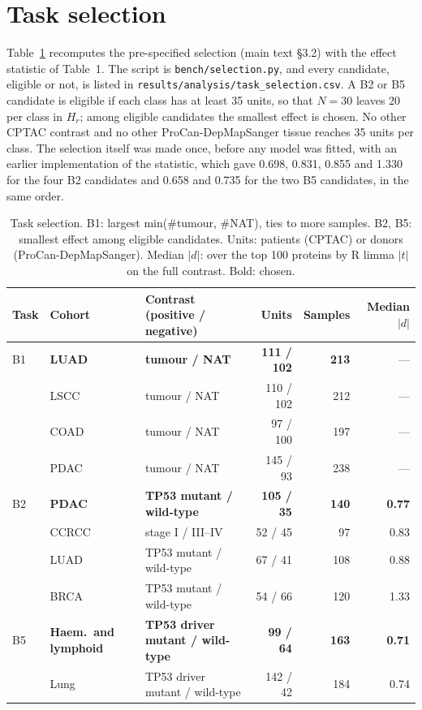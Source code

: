 \documentclass[10pt,letterpaper]{article}
\begin{document}
\section{Task selection}\label{sup:selection}
Table~\ref{tab:selection} recomputes the pre-specified selection (main text \S3.2) with the effect statistic
of Table~1. The script is \texttt{bench/selection.py}, and every candidate, eligible or not, is listed in
\texttt{results/analysis/task\_selection.csv}. A B2 or B5 candidate is eligible if each class has at least 35
units, so that $N = 30$ leaves 20 per class in $H_r$; among eligible candidates the smallest effect is chosen.
No other CPTAC contrast and no other ProCan-DepMapSanger tissue reaches 35 units per class. The selection itself
was made once, before any model was fitted, with an earlier implementation of the statistic, which gave 0.698,
0.831, 0.855 and 1.330 for the four B2 candidates and 0.658 and 0.735 for the two B5 candidates, in the same
order.

\begin{table}[H]
\centering
\caption{Task selection. B1: largest min(\#tumour, \#NAT), ties to more samples. B2, B5: smallest effect among
eligible candidates. Units: patients (CPTAC) or donors (ProCan-DepMapSanger). Median $|d|$: over the top 100
proteins by R limma $|t|$ on the full contrast. Bold: chosen.}
\label{tab:selection}
\begin{tabular}{@{}l l l r r r@{}}
\toprule
Task & Cohort & Contrast (positive / negative) & Units & Samples & Median $|d|$ \\
\midrule
B1 & \textbf{LUAD} & \textbf{tumour / NAT} & \textbf{111 / 102} & \textbf{213} & --- \\
 & LSCC & tumour / NAT & 110 / 102 & 212 & --- \\
 & COAD & tumour / NAT & 97 / 100 & 197 & --- \\
 & PDAC & tumour / NAT & 145 / 93 & 238 & --- \\
\midrule
B2 & \textbf{PDAC} & \textbf{TP53 mutant / wild-type} & \textbf{105 / 35} & \textbf{140} & \textbf{0.77} \\
 & CCRCC & stage I / III--IV & 52 / 45 & 97 & 0.83 \\
 & LUAD & TP53 mutant / wild-type & 67 / 41 & 108 & 0.88 \\
 & BRCA & TP53 mutant / wild-type & 54 / 66 & 120 & 1.33 \\
\midrule
B5 & \textbf{Haem.\ and lymphoid} & \textbf{TP53 driver mutant / wild-type} & \textbf{99 / 64} & \textbf{163} & \textbf{0.71} \\
 & Lung & TP53 driver mutant / wild-type & 142 / 42 & 184 & 0.74 \\
\bottomrule
\end{tabular}
\end{table}
\end{document}
